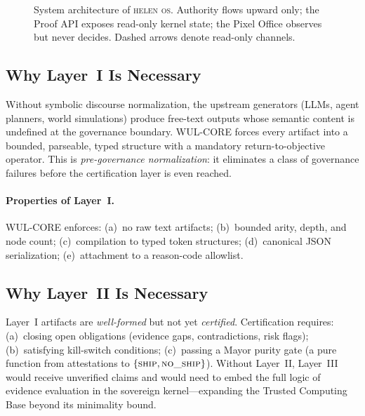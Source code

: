 \documentclass[11pt,a4paper]{article}
\theoremstyle{plain}
\theoremstyle{definition}
\theoremstyle{remark}
\newcommand{\SHIP}{\textsc{ship}}
\newcommand{\NOSHIP}{\textsc{no\textunderscore{}ship}}
\begin{document}
\begin{figure}[t]
\caption{System architecture of \textsc{helen os}.
  Authority flows upward only; the Proof API exposes read-only kernel state;
  the Pixel Office observes but never decides.
  Dashed arrows denote read-only channels.}
\label{fig:architecture}
\end{figure}

\subsection{Why Layer~I Is Necessary}
\label{sec:l1}

Without symbolic discourse normalization, the upstream generators
(LLMs, agent planners, world simulations)
produce free-text outputs whose semantic content is undefined at the governance
boundary.
WUL-CORE forces every artifact into a bounded, parseable,
typed structure with a mandatory return-to-objective operator.
This is \emph{pre-governance normalization}: it eliminates a class of
governance failures before the certification layer is even reached.

\paragraph{Properties of Layer~I.}
WUL-CORE enforces: (a)~no raw text artifacts;
(b)~bounded arity, depth, and node count;
(c)~compilation to typed token structures;
(d)~canonical JSON serialization;
(e)~attachment to a reason-code allowlist.

\subsection{Why Layer~II Is Necessary}
\label{sec:l2}

Layer~I artifacts are \emph{well-formed} but not yet \emph{certified}.
Certification requires:
(a)~closing open obligations (evidence gaps, contradictions, risk flags);
(b)~satisfying kill-switch conditions;
(c)~passing a Mayor purity gate (a pure function from attestations to $\{\SHIP, \NOSHIP\}$).
Without Layer~II, Layer~III would receive unverified claims and would need to
embed the full logic of evidence evaluation in the sovereign kernel---expanding the
Trusted Computing Base beyond its minimality bound.
\end{document}
